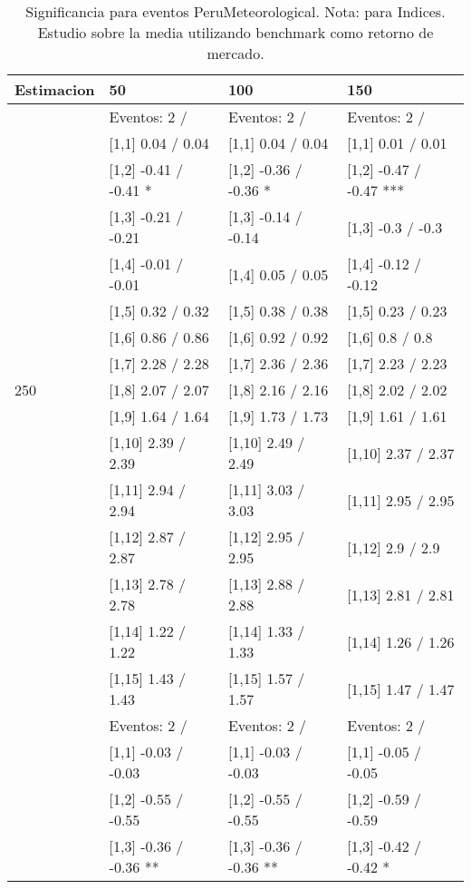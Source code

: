 \begin{table}

\caption{Significancia para eventos PeruMeteorological. Nota: para Indices. Estudio sobre la media utilizando benchmark como retorno de mercado.}
\centering
\begin{tabular}[t]{llll}
\toprule
Estimacion & 50 & 100 & 150\\
\midrule
 & Eventos:  2 / & Eventos:  2 / & Eventos:  2 /\\
 & {}[1,1] 0.04  / 0.04 & {}[1,1] 0.04  / 0.04 & {}[1,1] 0.01  / 0.01\\
 & {}[1,2] -0.41  / -0.41 * & {}[1,2] -0.36  / -0.36 * & {}[1,2] -0.47  / -0.47 ***\\
 & {}[1,3] -0.21  / -0.21 & {}[1,3] -0.14  / -0.14 & {}[1,3] -0.3  / -0.3\\
 & {}[1,4] -0.01  / -0.01 & {}[1,4] 0.05  / 0.05 & {}[1,4] -0.12  / -0.12\\
\addlinespace
 & {}[1,5] 0.32  / 0.32 & {}[1,5] 0.38  / 0.38 & {}[1,5] 0.23  / 0.23\\
 & {}[1,6] 0.86  / 0.86 & {}[1,6] 0.92  / 0.92 & {}[1,6] 0.8  / 0.8\\
 & {}[1,7] 2.28  / 2.28 & {}[1,7] 2.36  / 2.36 & {}[1,7] 2.23  / 2.23\\
250 & {}[1,8] 2.07  / 2.07 & {}[1,8] 2.16  / 2.16 & {}[1,8] 2.02  / 2.02\\
 & {}[1,9] 1.64  / 1.64 & {}[1,9] 1.73  / 1.73 & {}[1,9] 1.61  / 1.61\\
\addlinespace
 & {}[1,10] 2.39  / 2.39 & {}[1,10] 2.49  / 2.49 & {}[1,10] 2.37  / 2.37\\
 & {}[1,11] 2.94  / 2.94 & {}[1,11] 3.03  / 3.03 & {}[1,11] 2.95  / 2.95\\
 & {}[1,12] 2.87  / 2.87 & {}[1,12] 2.95  / 2.95 & {}[1,12] 2.9  / 2.9\\
 & {}[1,13] 2.78  / 2.78 & {}[1,13] 2.88  / 2.88 & {}[1,13] 2.81  / 2.81\\
 & {}[1,14] 1.22  / 1.22 & {}[1,14] 1.33  / 1.33 & {}[1,14] 1.26  / 1.26\\
\addlinespace
 & {}[1,15] 1.43  / 1.43 & {}[1,15] 1.57  / 1.57 & {}[1,15] 1.47  / 1.47\\
 & Eventos:  2 / & Eventos:  2 / & Eventos:  2 /\\
 & {}[1,1] -0.03  / -0.03 & {}[1,1] -0.03  / -0.03 & {}[1,1] -0.05  / -0.05\\
 & {}[1,2] -0.55  / -0.55 & {}[1,2] -0.55  / -0.55 & {}[1,2] -0.59  / -0.59\\
 & {}[1,3] -0.36  / -0.36 ** & {}[1,3] -0.36  / -0.36 ** & {}[1,3] -0.42  / -0.42 *\\

\end{tabular}
\end{table}
